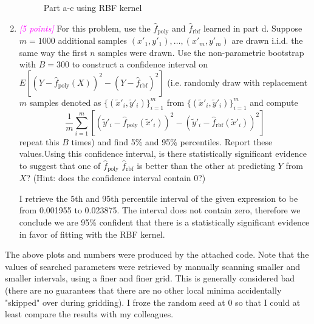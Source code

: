 \documentclass{article}
\newcommand{\1}{\mathbf{1}}
\newcommand{\points}[1]{\small\textcolor{magenta}{\emph{[#1 points]}} \normalsize}
\begin{document}
\begin{enumerate}
\begin{figure}[h!]
        \caption{Part a-c using RBF kernel}
    \end{figure}
    
    \item \points{5}For this problem, use the $\widehat f_{\text{poly}}$ and $\widehat f_{\text{rbf}}$ learned in part d. Suppose $m=1000$ additional samples $(x'_1,y'_1),\hdots ,(x'_m,y'_m)$ are drawn i.i.d. the same way the first $n$ samples were drawn. Use the non-parametric bootstrap with $B=300$ to construct a confidence interval on $E[(Y - \widehat f_{\text{poly}} (X))^2 - (Y - \widehat f_{\text{rbf}})^2]$ (i.e. randomly draw with replacement $m$ samples denoted as $\{(\tilde x'_i, \tilde y'_i)\}^m_{i=1}$ from $\{(\tilde x'_i, \tilde y'_i)\}^m_{i=1}$ and compute 
    $$\frac{1}{m}\sum^m_{i=1} \left[(\tilde  y'_i - \widehat f_{\text{poly}} (\tilde x'_i))^2 - (\tilde y'_i - \widehat f_{\text{rbf}} (\tilde x'_i))^2\right]$$
    repeat this $B$ times) and find 5\% and 95\% percentiles. Report these values.Using this confidence interval, is there statistically significant evidence to suggest that one of $\widehat f_{\text{poly}}$ $\widehat f_{\text{rbf}}$ is better than the other at predicting $Y$ from $X$? (Hint:  does the confidence interval contain 0?)
    
    I retrieve the 5th and 95th percentile interval of the given expression to be from  0.001955 to 0.023875. The interval does not contain zero, therefore we conclude we are 95\% confident that there is a statistically significant evidence in favor of fitting with the RBF kernel.
\end{enumerate}

The above plots and numbers were produced by the attached code. Note that the values of searched parameters were retrieved by manually scanning smaller and smaller intervals, using a finer and finer grid. This is generally considered bad (there are no guarantees that there are no other local minima accidentally "skipped" over during gridding). I froze the random seed at 0 so that I could at least compare the results with my colleagues.
  
\end{document}
